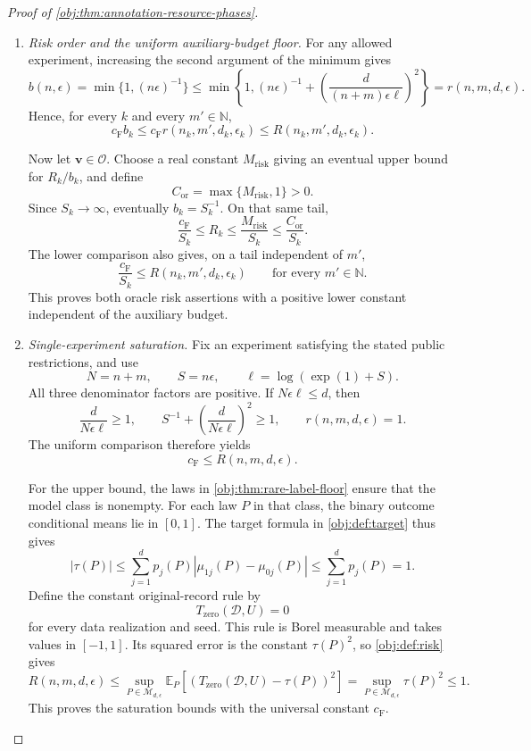 \begin{proof}[Proof of \cref{obj:thm:annotation-resource-phases}]
\begin{enumerate}
\item \emph{Risk order and the uniform auxiliary-budget floor.}
For any allowed experiment, increasing the second argument of the minimum gives
\[
b(n,\epsilon)
=\min\{1,(n\epsilon)^{-1}\}
\le
\min\left\{1,(n\epsilon)^{-1}
+\left(\frac{d}{(n+m)\epsilon\ell}\right)^2\right\}
=r(n,m,d,\epsilon).
\]
Hence, for every \(k\) and every \(m'\in\mathbb N\),
\[
c_{\mathrm F}b_k
\le c_{\mathrm F}r(n_k,m',d_k,\epsilon_k)
\le R(n_k,m',d_k,\epsilon_k).
\]

Now let \(\mathbf v\in\mathcal O\). Choose a real constant
\(M_{\mathrm{risk}}\) giving an eventual upper bound for \(R_k/b_k\), and define
\[
C_{\mathrm{or}}=\max\{M_{\mathrm{risk}},1\}>0.
\]
Since \(S_k\to\infty\), eventually \(b_k=S_k^{-1}\). On that same tail,
\[
\frac{c_{\mathrm F}}{S_k}\le R_k
\le\frac{M_{\mathrm{risk}}}{S_k}
\le\frac{C_{\mathrm{or}}}{S_k}.
\]
The lower comparison also gives, on a tail independent of \(m'\),
\[
\frac{c_{\mathrm F}}{S_k}
\le R(n_k,m',d_k,\epsilon_k)
\qquad\text{for every }m'\in\mathbb N.
\]
This proves both oracle risk assertions with a positive lower constant independent of the auxiliary budget.

\item \emph{Single-experiment saturation.}
Fix an experiment satisfying the stated public restrictions, and use
\[
N=n+m,\qquad
S=n\epsilon,\qquad
\ell=\log(\exp(1)+S).
\]
All three denominator factors are positive. If \(N\epsilon\ell\le d\), then
\[
\frac{d}{N\epsilon\ell}\ge1,
\qquad
S^{-1}+\left(\frac{d}{N\epsilon\ell}\right)^2\ge1,
\qquad
r(n,m,d,\epsilon)=1.
\]
The uniform comparison therefore yields
\[
c_{\mathrm F}\le R(n,m,d,\epsilon).
\]

For the upper bound, the laws in
\cref{obj:thm:rare-label-floor} ensure that the model class is nonempty. For each law \(P\) in that class, the binary outcome conditional means lie in \([0,1]\). The target formula in \cref{obj:def:target} thus gives
\[
|\tau(P)|
\le\sum_{j=1}^{d}p_j(P)
       |\mu_{1j}(P)-\mu_{0j}(P)|
\le\sum_{j=1}^{d}p_j(P)=1.
\]
Define the constant original-record rule by
\[
T_{\mathrm{zero}}(\mathcal D,U)=0
\]
for every data realization and seed. This rule is Borel measurable and takes values in \([-1,1]\). Its squared error is the constant \(\tau(P)^2\), so \cref{obj:def:risk} gives
\[
R(n,m,d,\epsilon)
\le
\sup_{P\in\mathcal M_{d,\epsilon}}
\mathbb E_P\!\left[
(T_{\mathrm{zero}}(\mathcal D,U)-\tau(P))^2
\right]
=
\sup_{P\in\mathcal M_{d,\epsilon}}\tau(P)^2
\le1.
\]
This proves the saturation bounds with the universal constant \(c_{\mathrm F}\).


\end{enumerate}
\end{proof}
